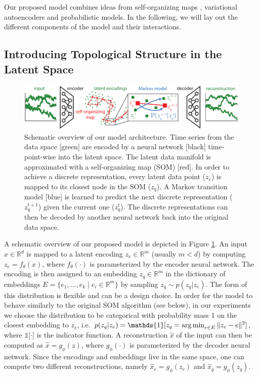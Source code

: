 Our proposed model combines ideas from self-organizing maps \citep{Kohonen1998}, variational autoencoders \citep{Kingma2013} and probabilistic models.
In the following, we will lay out the different components of the model and their interactions.


\subsection{Introducing Topological Structure in the Latent Space} \label{sec:SOM-VAE}

\begin{figure}
    \centering
    \includegraphics[width=\textwidth]{Overview_SOM-VAE.pdf}
    \caption{Schematic overview of our model architecture. Time series from the data space [green] are encoded by a neural network [black] time-point-wise into the latent space. The latent data manifold is approximated with a self-organizing map (SOM) [red]. In order to achieve a discrete representation, every latent data point ($z_e$) is mapped to its closest node in the SOM ($z_q$). A Markov transition model [blue] is learned to predict the next discrete representation ($z_q^{t+1}$) given the current one ($z_q^t$). The discrete representations can then be decoded by another neural network back into the original data space.}
    \label{fig:overview}
\end{figure}


A schematic overview of our proposed model is depicted in Figure \ref{fig:overview}.
An input $x \in \mathbb{R}^d$ is mapped to a latent encoding $z_e \in \mathbb{R}^m$ (usually $m < d$) by computing $z_e = f_{\theta}(x)$, where $f_{\theta}(\cdot)$ is parameterized by the encoder neural network.
The encoding is then assigned to an embedding $z_q \in \mathbb{R}^m$ in the dictionary of embeddings $E = \lbrace e_1, \dots, e_k \; \vert \; e_i \in \mathbb{R}^m \rbrace$ by sampling $z_q \sim p(z_q | z_e)$.
The form of this distribution is flexible and can be a design choice.
In order for the model to behave similarly to the original SOM algorithm (see below), in our experiments we choose the distribution to be categorical with probability mass 1 on the closest embedding to $z_e$, i.e.\ $p(z_q | z_e) = \mathds{1} \lbrack z_q = \argmin_{e \in E} \| z_e - e\|^2 \rbrack$, where $\mathds{1} \lbrack \cdot \rbrack$ is the indicator function.
A reconstruction $\hat{x}$ of the input can then be computed as $\hat{x} = g_{\phi}(z)$, where $g_{\phi}(\cdot)$ is parameterized by the decoder neural network.
Since the encodings and embeddings live in the same space, one can compute two different reconstructions, namely $\hat{x}_e = g_{\phi}(z_e)$ and $\hat{x}_q = g_{\phi}(z_q)$.

